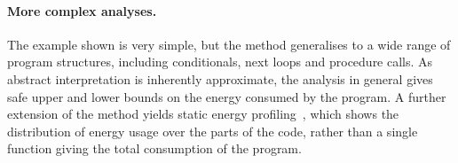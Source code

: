 \paragraph{More complex analyses.} The example shown is very simple, but the method generalises to
a wide range of program structures, including conditionals, next loops and procedure calls.  
As abstract interpretation is inherently approximate, the analysis in general gives safe upper and lower bounds on the energy
consumed by the program. 
A further extension of the method yields
static energy profiling~\cite{staticprofiling-flops}, which shows the
distribution of energy usage over the parts of the code, rather than a single function giving the total consumption of the program.
